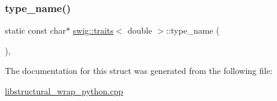\subsubsection{\texorpdfstring{type\+\_\+name()}{type\_name()}}
{\footnotesize\ttfamily static const char$\ast$ \hyperlink{structswig_1_1traits}{swig\+::traits}$<$ double $>$\+::type\+\_\+name (\begin{DoxyParamCaption}{ }\end{DoxyParamCaption})\hspace{0.3cm}{\ttfamily [inline]}, {\ttfamily [static]}}



The documentation for this struct was generated from the following file\+:\begin{DoxyCompactItemize}
\item 
\hyperlink{libstructural__wrap__python_8cpp}{libstructural\+\_\+wrap\+\_\+python.\+cpp}\end{DoxyCompactItemize}
